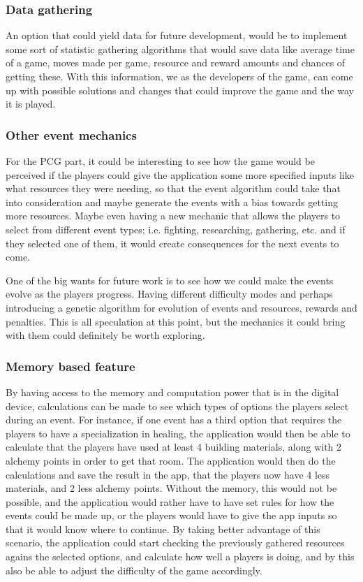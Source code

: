 \subsubsection{Data gathering}
An option that could yield data for future development, would be to implement some sort of statistic gathering algorithms that would save data like average time of a game, moves made per game, resource and reward amounts and chances of getting these. With this information, we as the developers of the game, can come up with possible solutions and changes that could improve the game and the way it is played.

\subsubsection{Other event mechanics}
For the PCG part, it could be interesting to see how the game would be perceived if the players could give the application some more specified inputs like what resources they were needing, so that the event algorithm could take that into consideration and maybe generate the events with a bias towards getting more resources. Maybe even having a new mechanic that allows the players to select from different event types; i.e. fighting, researching, gathering, etc. and if they selected one of them, it would create consequences for the next events to come.

One of the big wants for future work is to see how we could make the events evolve as the players progress. Having different difficulty modes and perhaps introducing a genetic algorithm for evolution of events and resources, rewards and penalties. This is all speculation at this point, but the mechanics it could bring with them could definitely be worth exploring.

\subsubsection{Memory based feature}
By having access to the memory and computation power that is in the digital device, calculations can be made to see which types of options the players select during an event. For instance, if one event has a third option that requires the players to have a specialization in healing, the application would then be able to calculate that the players have used at least 4 building materials, along with 2 alchemy points in order to get that room. The application would then do the calculations and save the result in the app, that the players now have 4 less materials, and 2 less alchemy points. Without the memory, this would not be possible, and the application would rather have to have set rules for how the events could be made up, or the players would have to give the app inputs so that it would know where to continue. By taking better advantage of this scenario, the application could start checking the previously gathered resources agains the selected options, and calculate how well a players is doing, and by this also be able to adjust the difficulty of the game accordingly.

